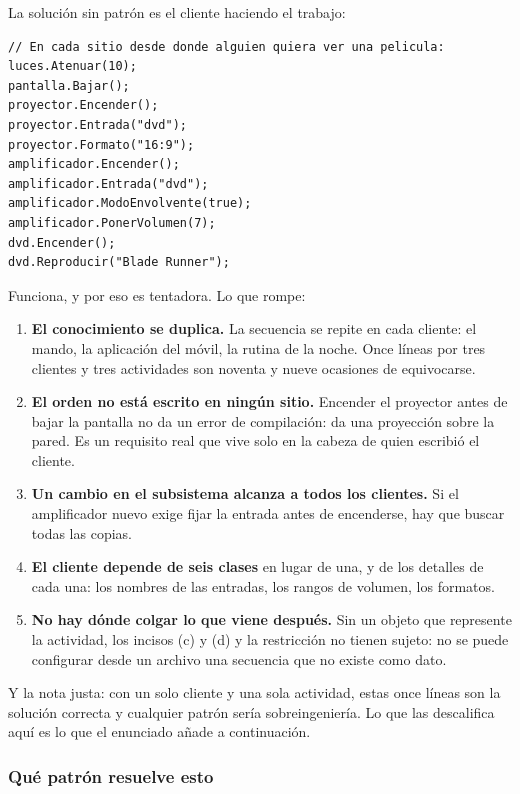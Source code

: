 La solución sin patrón es el cliente haciendo el trabajo:

{\small
\begin{verbatim}
// En cada sitio desde donde alguien quiera ver una pelicula:
luces.Atenuar(10);
pantalla.Bajar();
proyector.Encender();
proyector.Entrada("dvd");
proyector.Formato("16:9");
amplificador.Encender();
amplificador.Entrada("dvd");
amplificador.ModoEnvolvente(true);
amplificador.PonerVolumen(7);
dvd.Encender();
dvd.Reproducir("Blade Runner");
\end{verbatim}
}

Funciona, y por eso es tentadora. Lo que rompe:

\begin{enumerate}[leftmargin=1.2cm]
    \item \textbf{El conocimiento se duplica.} La secuencia se repite en cada cliente: el
          mando, la aplicación del móvil, la rutina de la noche. Once líneas por tres
          clientes y tres actividades son noventa y nueve ocasiones de equivocarse.
    \item \textbf{El orden no está escrito en ningún sitio.} Encender el proyector antes de
          bajar la pantalla no da un error de compilación: da una proyección sobre la pared.
          Es un requisito real que vive solo en la cabeza de quien escribió el cliente.
    \item \textbf{Un cambio en el subsistema alcanza a todos los clientes.} Si el
          amplificador nuevo exige fijar la entrada antes de encenderse, hay que buscar
          todas las copias.
    \item \textbf{El cliente depende de seis clases} en lugar de una, y de los detalles de
          cada una: los nombres de las entradas, los rangos de volumen, los formatos.
    \item \textbf{No hay dónde colgar lo que viene después.} Sin un objeto que represente la
          actividad, los incisos (c) y (d) y la restricción no tienen sujeto: no se puede
          configurar desde un archivo una secuencia que no existe como dato.
\end{enumerate}

Y la nota justa: con un solo cliente y una sola actividad, estas once líneas son la solución
correcta y cualquier patrón sería sobreingeniería. Lo que las descalifica aquí es lo que el
enunciado añade a continuación.

\subsubsection*{Qué patrón resuelve esto}

